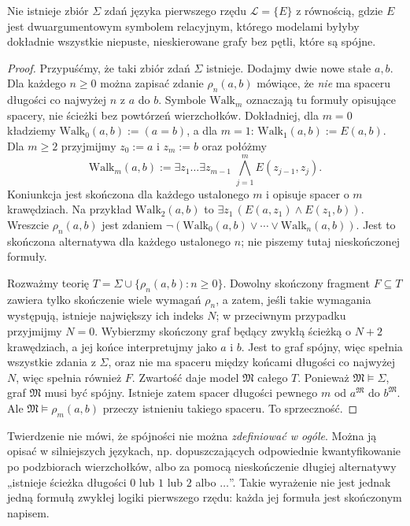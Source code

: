 \begin{twierdzenie}\label{thm:compactness-not-connectivity}
Nie istnieje zbiór $\Sigma$ zdań języka pierwszego rzędu $\mathcal L=\{E\}$ z równością, gdzie $E$ jest dwuargumentowym symbolem relacyjnym, którego modelami byłyby dokładnie wszystkie niepuste, nieskierowane grafy bez pętli, które są spójne.
\end{twierdzenie}
\begin{proof}
Przypuśćmy, że taki zbiór zdań $\Sigma$ istnieje. Dodajmy dwie nowe stałe $a,b$. Dla każdego $n\ge0$ można zapisać zdanie $\rho_n(a,b)$ mówiące, że \emph{nie} ma spaceru długości co najwyżej $n$ z $a$ do $b$. Symbole $\mathrm{Walk}_m$ oznaczają tu formuły opisujące spacery, nie ścieżki bez powtórzeń wierzchołków. Dokładniej, dla $m=0$ kładziemy
$\mathrm{Walk}_0(a,b):=(a=b)$, a dla $m=1$:
$\mathrm{Walk}_1(a,b):=E(a,b)$. Dla $m\ge2$ przyjmijmy $z_0:=a$ i $z_m:=b$ oraz połóżmy
\[
\mathrm{Walk}_m(a,b):=\exists z_1\ldots\exists z_{m-1}\;
\bigwedge_{j=1}^{m}E(z_{j-1},z_j).
\]
Koniunkcja jest skończona dla każdego ustalonego $m$ i opisuje spacer o $m$ krawędziach. Na przykład $\mathrm{Walk}_2(a,b)$ to $\exists z_1\,(E(a,z_1)\land E(z_1,b))$.
Wreszcie $\rho_n(a,b)$ jest zdaniem
$\neg(\mathrm{Walk}_0(a,b)\lor\cdots\lor\mathrm{Walk}_n(a,b))$.
Jest to skończona alternatywa dla każdego ustalonego $n$;
nie piszemy tutaj nieskończonej formuły.

Rozważmy teorię $T=\Sigma\cup\{\rho_n(a,b):n\ge0\}$. Dowolny skończony fragment $F\subseteq T$ zawiera tylko skończenie wiele wymagań $\rho_n$, a zatem, jeśli takie wymagania występują, istnieje największy ich indeks $N$; w przeciwnym przypadku przyjmijmy $N=0$. Wybierzmy skończony graf będący zwykłą ścieżką o $N+2$ krawędziach, a jej końce interpretujmy jako $a$ i $b$. Jest to graf spójny, więc spełnia wszystkie zdania z $\Sigma$, oraz nie ma spaceru między końcami długości co najwyżej $N$, więc spełnia również $F$. Zwartość daje model $\mathfrak M$ całego $T$. Ponieważ $\mathfrak M\models\Sigma$, graf $\mathfrak M$ musi być spójny. Istnieje zatem spacer długości pewnego $m$ od $a^{\mathfrak M}$ do $b^{\mathfrak M}$. Ale $\mathfrak M\models\rho_m(a,b)$ przeczy istnieniu takiego spaceru. To sprzeczność.
\end{proof}

\begin{uwaga}
Twierdzenie nie mówi, że spójności nie można \emph{zdefiniować w ogóle}. Można ją opisać w silniejszych językach, np. dopuszczających odpowiednie kwantyfikowanie po podzbiorach wierzchołków, albo za pomocą nieskończenie długiej alternatywy „istnieje ścieżka długości $0$ lub $1$ lub $2$ albo $\ldots$”. Takie wyrażenie nie jest jednak jedną formułą zwykłej logiki pierwszego rzędu: każda jej formuła jest skończonym napisem.
\end{uwaga}


